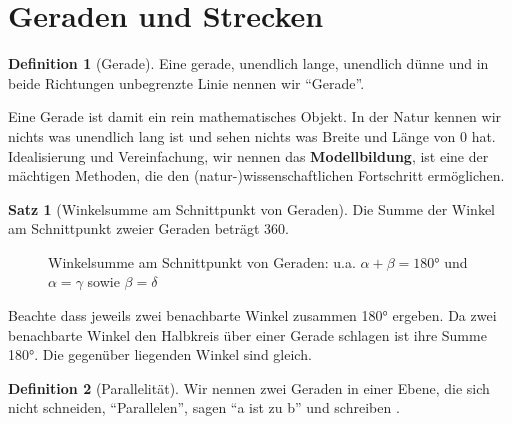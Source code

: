 \documentclass[a4paper]{book}%
\theoremstyle{definition}
\newtheorem{definition}{Definition}
\newtheorem{satz}{Satz}
\begin{document}
\section{Geraden und Strecken}

\begin{definition}[Gerade]\label{def:Gerade}
    Eine gerade, unendlich lange, unendlich dünne und in beide Richtungen unbegrenzte Linie nennen wir \enquote{Gerade}.
\end{definition}

Eine Gerade ist damit ein rein mathematisches Objekt. In der Natur kennen wir nichts was unendlich lang ist und sehen nichts was Breite und Länge von 0 hat. Idealisierung und Vereinfachung, wir nennen das \textbf{Modellbildung}, ist eine der mächtigen Methoden, die den (natur-)wissenschaftlichen Fortschritt ermöglichen.

\begin{satz}[Winkelsumme am Schnittpunkt von Geraden]
    Die Summe der Winkel am Schnittpunkt zweier Geraden beträgt 360.
\end{satz}

\begin{figure}
  \centering
  \caption{Winkelsumme am Schnittpunkt von Geraden: u.a. $\alpha + \beta = 180°$ und $\alpha = \gamma$ sowie $\beta = \delta$}\label{fig:WinkelsummeSchnittpunkt}
\end{figure}

Beachte dass jeweils zwei benachbarte Winkel zusammen 180° ergeben. Da zwei benachbarte Winkel den Halbkreis über einer Gerade schlagen ist ihre Summe 180°. Die gegenüber liegenden Winkel sind gleich.


\begin{definition}[Parallelität]\label{def:parallel}
    Wir nennen zwei Geraden in einer Ebene, die sich nicht schneiden, \enquote{Parallelen}, sagen \enquote{a ist  zu b} und schreiben .
\end{definition}
\end{document}
